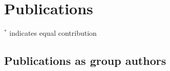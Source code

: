 \clearpage
\section{Publications}
$^*$ indicates equal contribution
\nocite{*}
\printbibliography[heading=none, notkeyword={covid}]
\subsection*{Publications as group authors}
\printbibliography[heading=none, keyword={covid}]